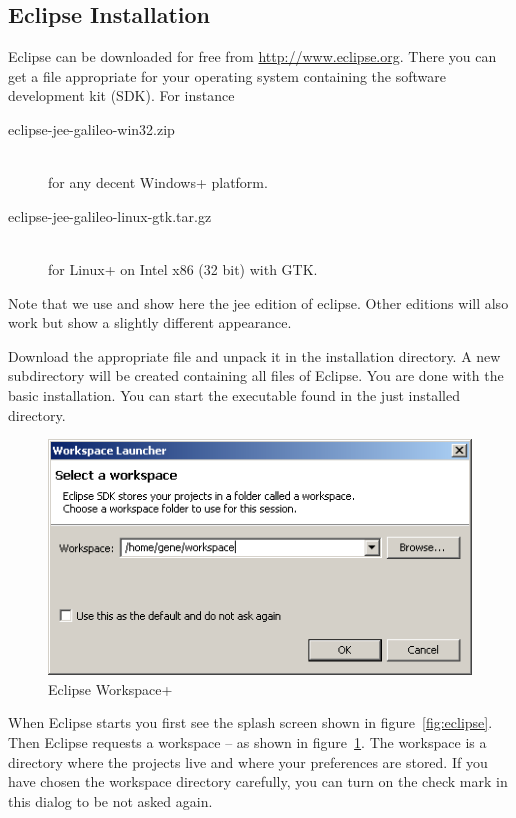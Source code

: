 \subsection{Eclipse Installation}

Eclipse can be downloaded for free from \url{http://www.eclipse.org}.
There you can get a file appropriate for your operating system
containing the software development kit (SDK). For instance
\begin{description}
\item [eclipse-jee-galileo-win32.zip]\ \\
  for any decent \+Windows+ platform.
\item [eclipse-jee-galileo-linux-gtk.tar.gz]\ \\
  for \+Linux+ on Intel x86 (32 bit) with GTK.
\end{description}

Note that we use and show here the jee edition of eclipse. Other editions will also work but show a
slightly different appearance.

Download the appropriate file and unpack it in the installation
directory. A new subdirectory  will be created
containing all files of Eclipse. You are done with the basic
installation. You can start the  executable found in
the just installed directory.

\begin{figure}[ht]
  \centering  \includegraphics[scale=.5]{image/eclipse/workspace}
  \caption{\+Eclipse Workspace+}\label{fig:eclipse-workspace}
\end{figure}
When Eclipse starts you first see the splash
screen shown in figure~\ref{fig:eclipse}.
Then Eclipse requests a workspace -- as shown in
figure~\ref{fig:eclipse-workspace}. The
workspace is a directory where the projects
live and where your preferences are stored. If you have chosen the
workspace directory carefully, you can turn on the check mark in this
dialog to be not asked again.

